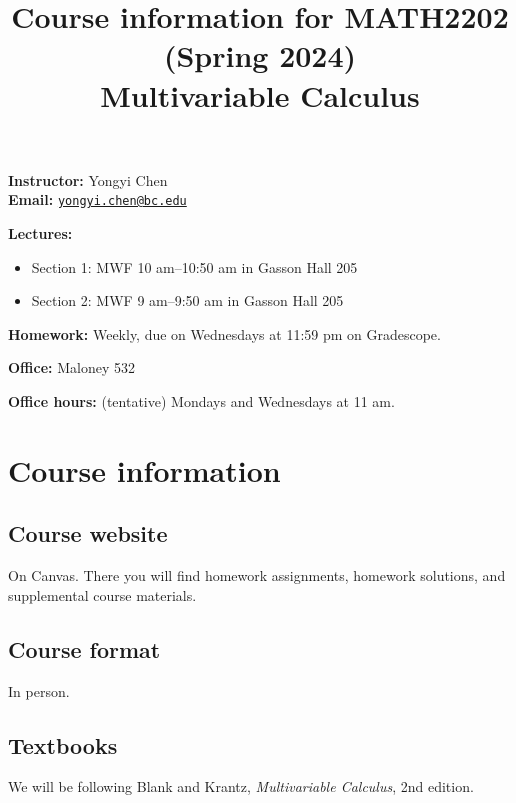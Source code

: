 \documentclass[11pt,oneside]{amsart}
\title{Course information for MATH2202 (Spring 2024)\\
    Multivariable Calculus}
\begin{document}
\maketitle

\noindent\textbf{Instructor:} Yongyi Chen\\
\textbf{Email:} \href{mailto:yongyi.chen@bc.edu}{\texttt{yongyi.chen@bc.edu}}

\noindent\textbf{Lectures:}
\begin{itemize}
    \item Section 1: MWF 10 am--10:50 am in Gasson Hall 205
    \item Section 2: MWF 9 am--9:50 am in Gasson Hall 205
\end{itemize}

\noindent\textbf{Homework:} Weekly, due on Wednesdays at 11:59 pm on Gradescope.

\noindent\textbf{Office:} Maloney 532

\noindent\textbf{Office hours:} (tentative) Mondays and Wednesdays at 11 am.

\section*{Course information}
\subsection*{Course website}
On Canvas. There you will find homework assignments, homework solutions, and supplemental course materials.

\subsection*{Course format}
In person.

\subsection*{Textbooks}
We will be following Blank and Krantz, \emph{Multivariable Calculus}, 2nd edition.
\end{document}
